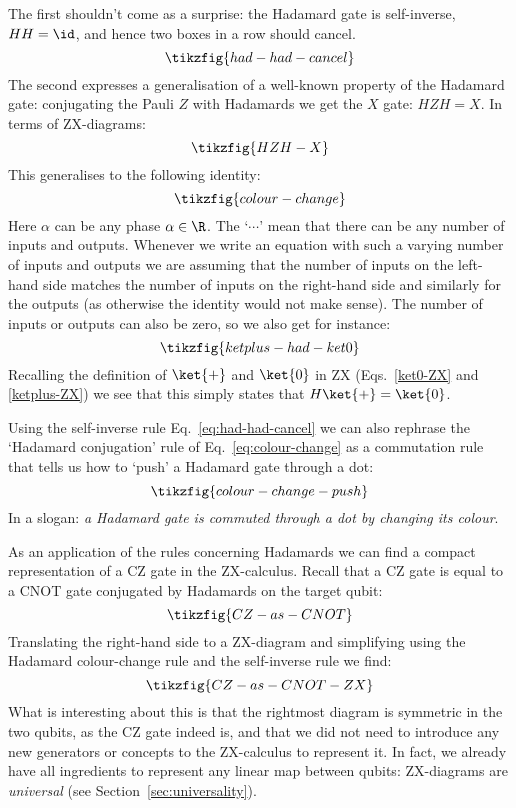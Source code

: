 \documentclass[a4paper,onecolumn,superscriptaddress,11pt,%
				unpublished,%
				allowfontchageintitle,%
				]{quantumarticle}
\begin{document}
The first shouldn't come as a surprise: the Hadamard gate is self-inverse, $HH=\id$, and hence two boxes in a row should cancel.
\begin{equation}\label{eq:had-had-cancel}
	\tikzfig{had-had-cancel}
\end{equation}
The second expresses a generalisation of a well-known property of the Hadamard gate: conjugating the Pauli $Z$ with Hadamards we get the $X$ gate: $HZH = X$. In terms of ZX-diagrams:
\begin{equation}
\tikzfig{HZH-X}
\end{equation}
This generalises to the following identity:
\begin{equation}\label{eq:colour-change}
	\tikzfig{colour-change}
\end{equation}
Here $\alpha$ can be any phase $\alpha\in \R$.
The `$\cdots$' mean that there can be any number of inputs and outputs. Whenever we write an equation with such a varying number of inputs and outputs we are assuming that the number of inputs on the left-hand side matches the number of inputs on the right-hand side and similarly for the outputs (as otherwise the identity would not make sense). The number of inputs or outputs can also be zero, so we also get for instance:
\begin{equation}
\tikzfig{ketplus-had-ket0}
\end{equation}
Recalling the definition of $\ket{+}$ and $\ket{0}$ in ZX (Eqs.~\eqref{ket0-ZX} and \eqref{ketplus-ZX}) we see that this simply states that $H\ket{+} = \ket{0}$.

Using the self-inverse rule Eq.~\eqref{eq:had-had-cancel} we can also rephrase the `Hadamard conjugation' rule of Eq.~\eqref{eq:colour-change} as a commutation rule that tells us how to `push' a Hadamard gate through a dot:
\begin{equation}\label{eq:colour-change-push}
	\tikzfig{colour-change-push}
\end{equation}
In a slogan: \emph{a Hadamard gate is commuted through a dot by changing its colour}.

As an application of the rules concerning Hadamards we can find a compact representation of a CZ gate in the ZX-calculus.
Recall that a CZ gate is equal to a CNOT gate conjugated by Hadamards on the target qubit:
\begin{equation}
\tikzfig{CZ-as-CNOT}
\end{equation}
Translating the right-hand side to a ZX-diagram and simplifying using the Hadamard colour-change rule and the self-inverse rule we find:
\begin{equation}\label{eq:CZ-in-ZX}
	\tikzfig{CZ-as-CNOT-ZX}
\end{equation}
What is interesting about this is that the rightmost diagram is symmetric in the two qubits, as the CZ gate indeed is, and that we did not need to introduce any new generators or concepts to the ZX-calculus to represent it.
In fact, we already have all ingredients to represent any linear map between qubits: ZX-diagrams are \emph{universal} (see Section~\ref{sec:universality}).
\end{document}
